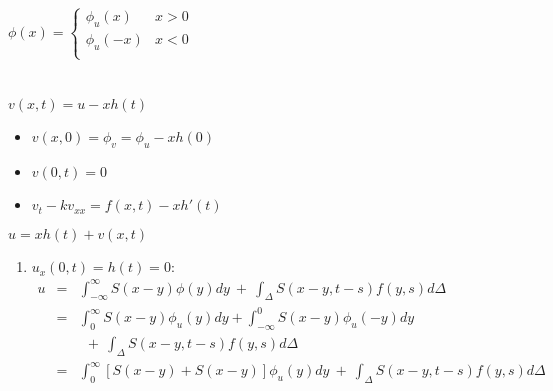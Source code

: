 \documentclass[12pt]{article}
\begin{document}
\begin{enumerate}
\begin{enumerate}
		$\phi(x) = 
			\begin{cases}
			\text{$\phi_u(x)$} & \text{$x > 0$} \\
			\text{$\phi_u(-x)$} & \text{$x < 0$} \\
			\end{cases}$ \\ \\ \\
		$v(x,t) = u - xh(t)$
			\begin{itemize}
			\item $v(x,0) = \phi_v = \phi_u - xh(0)$
			\item $v(0,t) = 0$
			\item $v_t - kv_{xx} = f(x,t) - xh'(t)$ \\
			\end{itemize}
		$u = xh(t) + v(x,t)$ \\
			\begin{enumerate}
			\item {\boldmath $u_x(0,t) = h(t) = 0:$}
				\begin{eqnarray*}
				u &=& \displaystyle\int_{-\infty}^{\infty}S(x-y)\phi(y)dy \ +\  \int_{\Delta}S(x-y,t-s)f(y,s)d\Delta \\
				&=& \displaystyle\int_{0}^{\infty}S(x-y)\phi_u(y)dy + \int_{-\infty}^{0}S(x-y)\phi_u(-y)dy \\
				&& \ \ +\  \int_{\Delta}S(x-y,t-s)f(y,s)d\Delta \\
				&=& \int_{0}^{\infty}[S(x-y) + S(x-y)]\phi_u(y)dy \ +\  \int_{\Delta}S(x-y,t-s)f(y,s)d\Delta \\
				\end{eqnarray*}
			\end{enumerate}
		\end{enumerate}
	\end{enumerate}
\end{document}
